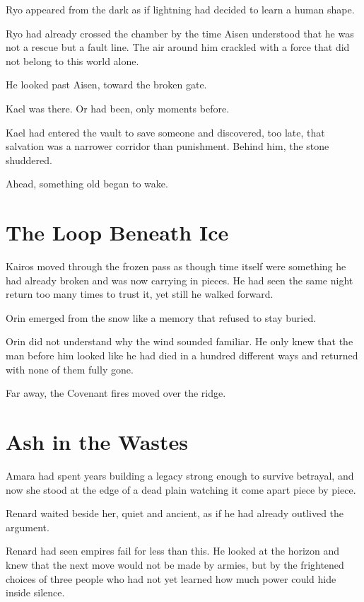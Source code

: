 \documentclass{cwbook}
\begin{document}
Ryo appeared from the dark as if lightning had decided to learn a human shape.



Ryo had already crossed the chamber by the time Aisen understood that he was not a rescue but a fault line. The air around him crackled with a force that did not belong to this world alone.

He looked past Aisen, toward the broken gate.

Kael was there. Or had been, only moments before.



Kael had entered the vault to save someone and discovered, too late, that salvation was a narrower corridor than punishment. Behind him, the stone shuddered.

Ahead, something old began to wake.

\chapter{The Loop Beneath Ice}


Kairos moved through the frozen pass as though time itself were something he had already broken and was now carrying in pieces. He had seen the same night return too many times to trust it, yet still he walked forward.

Orin emerged from the snow like a memory that refused to stay buried.



Orin did not understand why the wind sounded familiar. He only knew that the man before him looked like he had died in a hundred different ways and returned with none of them fully gone.

Far away, the Covenant fires moved over the ridge.

\chapter{Ash in the Wastes}


Amara had spent years building a legacy strong enough to survive betrayal, and now she stood at the edge of a dead plain watching it come apart piece by piece.

Renard waited beside her, quiet and ancient, as if he had already outlived the argument.



Renard had seen empires fail for less than this. He looked at the horizon and knew that the next move would not be made by armies, but by the frightened choices of three people who had not yet learned how much power could hide inside silence.
\end{document}
